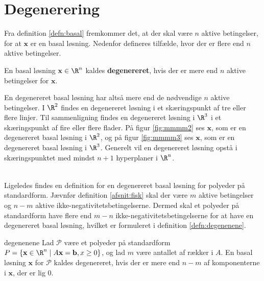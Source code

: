 \section{Degenerering}
Fra definition \ref{defn:basal} fremkommer det, at der skal være $n$ aktive betingelser, for at $\mathbf{x}$ er en basal løsning. 
Nedenfor defineres tilfælde, hvor der er flere end $n$ aktive betingelser. 
%
\begin{defn}{}{}
En basal løsning $\mathbf{x} \in \R^n$ kaldes \textbf{degenereret}, hvis der er mere end $n$ aktive betingelser for $\mathbf{x}$.
\end{defn}
\noindent
%
En degenereret basal løsning har altså mere end de nødvendige $n$ aktive betingelser.
% 
I $\R^2$ findes en degenereret løsning i et skæringspunkt af tre eller flere linjer. 
Til sammenligning findes en degenereret løsning i $\R^3$ i et skæringspunkt af fire eller flere flader. 
På figur \ref{fig:mmmm2} ses $\mathbf{x}$, som er en degenereret basal løsning i $\R^2$, og på figur  \ref{fig:mmmm3} ses $\mathbf{x}$, som er en degenereret basal løsning i $\R^3$.
Generelt vil en degenereret løsning opstå i skæringspunktet med mindst $n+1$ hyperplaner i $\R^n$.
%
%
\begin{center}
$
\begin{array}{cc}
&

\end{array}
$
\end{center}
%
%
Ligeledes findes en definition for en degenereret basal løsning for polyeder på standardform. 
Jævnfør definition \ref{afsnit:fisk} skal der være $m$ aktive betingelser og $n-m$ aktive ikke-negativitetsbetingelserne. 
Dermed skal et polyeder på standardform have flere end $m-n$ ikke-negativitetsbetingelserne for at have en degenereret basal løsning, hvilket er formuleret i definition \ref{defn:degenenene}. 
%
\begin{defn}{}{degenenene}
Lad $\mathcal{P}$ være et polyeder på standardform
$P=\{ \mathbf{x} \in \R^n \mid A \mathbf{x}=\mathbf{b},x \geq 0 \}$, og lad $m$ være antallet af rækker i $A$.
En basal løsning $\mathbf{x}$ for $\mathcal{P}$ kaldes degenereret, hvis der er mere end $n-m$ af komponenterne i $\mathbf{x}$, der er lig $0$.
\end{defn}
%
